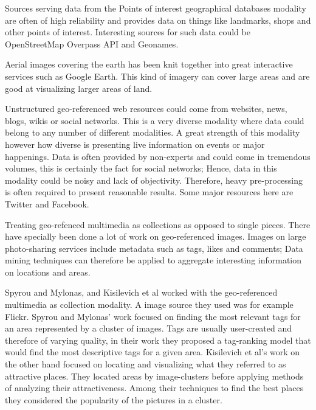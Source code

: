 \documentclass[journal]{IEEEtran}
\begin{document}
Sources serving data from the Points of interest geographical databases modality are often of high reliability and provides data on things like landmarks, shops and other points of interest. Interesting sources for such data could be OpenStreetMap Overpass API\cite{overpass} and Geonames\cite{geonames}. 

Aerial images covering the earth has been knit together into great interactive services such as Google Earth\cite{google-earth}. This kind of imagery can cover large areas and are good at visualizing larger areas of land. 

Unstructured geo-referenced web resources could come from websites, news, blogs, wikis or social networks. This is a very diverse modality where data could belong to any number of different modalities. A great strength of this modality however how diverse is presenting live information on events or major happenings. Data is often provided by non-experts and could come in tremendous volumes, this is certainly the fact for social networks; Hence, data in this modality could be noisy and lack of objectivity. Therefore, heavy pre-processing is often required to present reasonable results. Some major resources here are Twitter\cite{twitter} and Facebook\cite{facebook}. 

Treating geo-refenced multimedia as collections as opposed to single pieces. There have specially been done a lot of work on geo-referenced images. Images on large photo-sharing services include metadata such as tags, likes and comments; Data mining techniques can therefore be applied to aggregate interesting information on locations and areas.

Spyrou and Mylonas\cite{placing-meta-on-map}, and Kisilevich et al\cite{next-vacation} worked with the geo-referenced multimedia as collection modality. A image source they used was for example Flickr\cite{flickr}. Spyrou and Mylonas' work focused on finding the most relevant tags for an area represented by a cluster of images. Tags are usually user-created and therefore of varying quality, in their work they proposed a tag-ranking model that would find the most descriptive tags for a given area. Kisilevich et al's work on the other hand focused on locating and visualizing what they referred to as attractive places. They located areas by image-clusters before applying methods of analyzing their attractiveness. Among their techniques to find the best places they considered the popularity of the pictures in a cluster.
\end{document}
